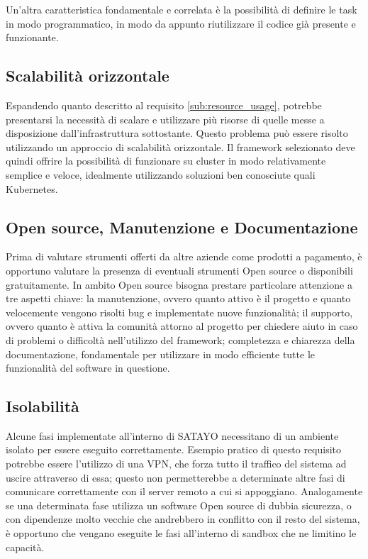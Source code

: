 Un'altra caratteristica fondamentale e correlata è la possibilità di definire le
task in modo programmatico, in modo da appunto riutilizzare il codice già presente
e funzionante.

\subsection{Scalabilità orizzontale}
\label{sub:scalable}

Espandendo quanto descritto al requisito \ref{sub:resource_usage}, potrebbe presentarsi
la necessità di scalare e utilizzare più risorse di quelle messe a disposizione dall'infrastruttura
sottostante. Questo problema può essere risolto utilizzando un approccio di
scalabilità orizzontale. Il framework selezionato deve quindi offrire la possibilità
di funzionare su cluster in modo relativamente semplice e veloce, idealmente
utilizzando soluzioni ben conosciute quali Kubernetes\cite{kubernetes}.

\subsection{Open source, Manutenzione e Documentazione}
\label{sub:open_source}

Prima di valutare strumenti offerti da altre aziende come prodotti a pagamento, è
opportuno valutare la presenza di eventuali strumenti Open source o disponibili gratuitamente.
In ambito Open source bisogna prestare particolare attenzione a tre aspetti
chiave: la manutenzione, ovvero quanto attivo è il progetto e quanto velocemente
vengono risolti bug e implementate nuove funzionalità; il supporto, ovvero
quanto è attiva la comunità attorno al progetto per chiedere aiuto in caso di
problemi o difficoltà nell'utilizzo del framework; completezza e chiarezza della
documentazione, fondamentale per utilizzare in modo efficiente tutte le
funzionalità del software in questione.

\subsection{Isolabilità}
\label{sub:isolation}

Alcune fasi implementate all'interno di SATAYO necessitano di un ambiente isolato
per essere eseguito correttamente. Esempio pratico di questo requisito potrebbe
essere l'utilizzo di una VPN, che forza tutto il traffico del sistema ad uscire attraverso
di essa; questo non permetterebbe a determinate altre fasi di comunicare
correttamente con il server remoto a cui si appoggiano. Analogamente se una determinata
fase utilizza un software Open source di dubbia sicurezza, o con dipendenze
molto vecchie che andrebbero in conflitto con il resto del sistema, è opportuno che
vengano eseguite le fasi all'interno di sandbox che ne limitino le capacità.

